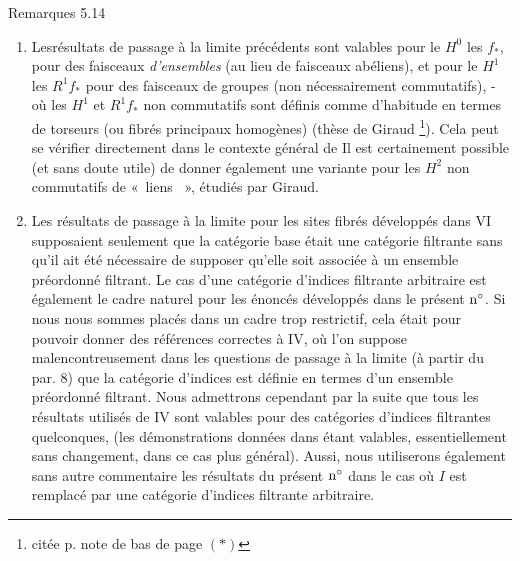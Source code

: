 \documentclass[10pt]{../fichiers-configuration-latex/smfart}
\begin{document}
\begin{enonce*}[remark]{Remarques 5.14}
\begin{enumerate}
\renewcommand{\theenumi}{\alph{enumi}}
\renewcommand{\labelenumi}{\theenumi)}
\item Les\pageoriginale résultats de passage à la limite précédents
  sont valables
pour le $H^{0}$ \resp les $f_{\ast}$, pour des faisceaux
\emph{d'ensembles} (au lieu de faisceaux abéliens), et pour le $H^{1}$
\resp les $R^1 f_{\ast}$ pour des faisceaux de groupes (non
nécessairement commutatifs), - où les $H^1$ et $R^1 f_{\ast}$ non
commutatifs sont définis comme d'habitude en termes de torseurs (ou
fibrés principaux homogènes) (\cf thèse de Giraud \footnote{citée p.
note de bas de page $(\ast)$}). Cela peut se vérifier directement dans
le contexte général de Il est certainement possible (et sans doute utile) de
donner également une variante pour les $H^2$ non commutatifs de « liens  », étudiés par Giraud.

\item Les résultats de passage à la limite pour les sites fibrés
développés dans VI supposaient seulement que la catégorie
base était
une catégorie filtrante sans qu'il ait été nécessaire
de supposer
qu'elle soit associée à un ensemble préordonné
filtrant. Le cas d'une
catégorie d'indices filtrante arbitraire est également le cadre
naturel pour les énoncés développés dans le
présent ${\rm n^{\circ}}$. Si nous
nous sommes placés dans un cadre trop restrictif, cela était pour
pouvoir donner des références correctes à \EGA IV, où
l'on suppose
malencontreusement dans les questions de passage à la limite (à partir
du par. 8) que la catégorie d'indices est définie en termes d'un
ensemble préordonné filtrant. Nous admettrons cependant par la suite
que tous les résultats utilisés de \EGA IV sont valables pour des
catégories d'indices filtrantes quelconques, (les démonstrations
données dans \loccit étant valables, essentiellement sans changement,
dans ce cas plus général). Aussi, nous utiliserons également sans
autre commentaire les résultats du présent ${\rm n^{\circ}}$
dans le cas où $I$
est remplacé par une catégorie d'indices filtrante arbitraire.
\end{enumerate}
\end{enonce*}

\ifx\danslelivre\undefined
\end{document}
